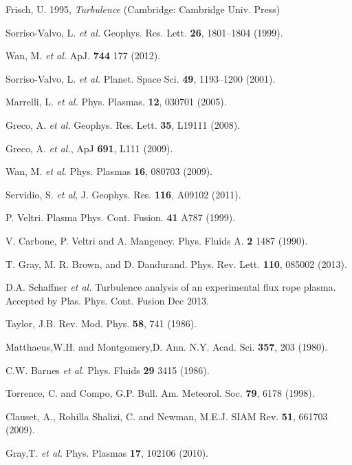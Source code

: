 \documentclass[aps,prl,amsmath,amssymb,reprint,superscriptaddress]{revtex4-1} %
\begin{document}
\providecommand{\noopsort}[1]{}\providecommand{\singleletter}[1]{#1}%
\begin{thebibliography}{99}

Frisch, U. 1995, {\it Turbulence} (Cambridge: Cambridge Univ. Press)

Sorriso-Valvo, L. {\it et al.} Geophys. Res. Lett. {\bf 26}, 1801–1804 (1999).

Wan, M. {\it et al.} ApJ. {\bf 744} 177 (2012).

Sorriso-Valvo, L. {\it et al.} Planet. Space Sci. {\bf 49}, 1193–1200 (2001).

Marrelli, L. {\it et al.} Phys. Plasmas. {\bf 12}, 030701 (2005).

Greco, A. {\it et al.} Geophys. Res. Lett. {\bf 35}, L19111 (2008).

Greco, A. {\it et al.}, ApJ {\bf 691}, L111 (2009).

Wan, M. {\it et al.} Phys. Plasmas {\bf 16}, 080703 (2009).

Servidio, S. {\it et al}, J. Geophys. Res. {\bf 116}, A09102 (2011).

P. Veltri. Plasma Phys. Cont. Fusion. {\bf 41} A787 (1999).

V. Carbone, P. Veltri and A. Mangeney. Phys. Fluids A. {\bf 2} 1487 (1990).

T. Gray, M. R. Brown, and D. Dandurand. Phys. Rev. Lett. {\bf 110}, 085002 (2013). 

D.A. Schaffner {\it et al.} Turbulence analysis of an experimental flux rope plasma. Accepted by Plas. Phys. Cont. Fusion Dec 2013.

Taylor, J.B. Rev. Mod. Phys. {\bf 58}, 741 (1986).

Matthaeus,W.H. and Montgomery,D. Ann. N.Y. Acad. Sci. {\bf 357}, 203 (1980).

C.W. Barnes {\it et al.} Phys. Fluids {\bf 29} 3415 (1986).

Torrence, C. and Compo, G.P. Bull. Am. Meteorol. Soc. {\bf 79}, 6178 (1998).

Clauset, A., Rohilla Shalizi, C. and Newman, M.E.J. SIAM Rev. {\bf 51}, 661703 (2009).

Gray,T. {\it et al.} Phys. Plasmas {\bf 17}, 102106 (2010).


\end{thebibliography}
\end{document}
